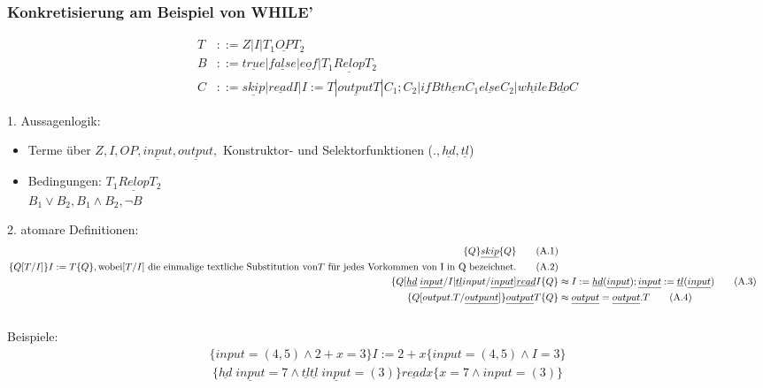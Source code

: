 \subsubsection{Konkretisierung am Beispiel von WHILE'}
\begin{align*}
T&::= Z | I | T_1 \underline{OP} T_2\\
B&::= \underline{true} | \underline{false} | \underline{eof} | T_1 \underline{Relop} T_2\\
C&::= \underline{skip} | \underline{read} I | I:=T | \underline{output} T | C_1;C_2 | \underline{if}B\underline{then}C_1\underline{else}C_2|\underline{while}B\underline{do}C
\end{align*}
\begin{compactitem}
	\item[1.] Aussagenlogik:
	\begin{itemize}
		\item Terme über $Z, I, OP, \underline{input}, \underline{output},$ Konstruktor- und Selektorfunktionen ($., \underline{hd}, \underline{tl}$)
		\item Bedingungen: $T_1 \underline{Relop} T_2$\\
		$B_1 \lor B_2, B_1 \land B_2, \lnot B$ 
	\end{itemize}
	\item[2.] atomare Definitionen:
		\begin{align}
			\{Q\}\underline{skip}\{Q\}\tag{A.1}\\
			\{Q[T/I]\}I:=T\{Q\},\text{wobei}[T/I]\text{ die einmalige textliche Substitution von} T \text{ für jedes Vorkommen von I in Q bezeichnet.}\tag{A.2}\\
			\{Q[\underline{hd} \; \underline{input}/I | \underline{tl} input / \underline{input}]\underline{read} I \{Q\} &\approx I:= \underline{hd}(\underline{
			input}); \underline{input} := \underline{tl} (\underline{input}) \tag{A.3}\\
			\{Q[output.T / \underline{outpunt}]\} \underline{output}T \{Q\} &\approx \underline{output}=\underline{output}.T\tag{A.4}\\
			\notag
		\end{align}
		Beispiele:
		\begin{align*}
		\{input=(4,5)\land2+x=3\} I:=2+x \{input=(4,5)\land I=3\}
		\end{align*}
		\begin{align*}
		\{\underline{hd}\;\underline{input}=7 \land \underline{tl} \underline{tl}\;\underline{input}=(3) \} \underline{read} x \{x=7 \land input=(3)\}

\end{align*}
\end{compactitem}
